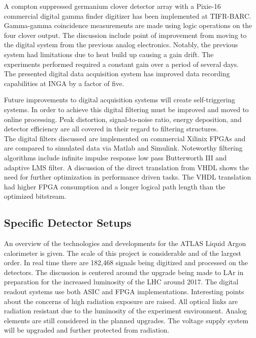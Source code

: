 \documentclass[12pt]{article}
\begin{document}
\begin{doublespacing}
{\large\textbf{\cite{Palit201290}}}

A compton suppressed germanium clover detector array with a Pixie-16 commercial digital gamma finder digitizer has been implemented at TIFR-BARC. Gamma-gamma coincidence measurements are made using logic operations on the four clover output. The discussion include point of improvement from moving to the digital system from the previous analog electronics. Notably, the previous system had limitations due to heat build up causing a gain drift. The experiments performed required a constant gain over a period of several days. The presented digital data acquisition system has improved data recording capabilities at INGA by a factor of five.
\\[20pt]


{\large\textbf{\cite{Alberto200999}}}

Future improvements to digital acquisition systems will create self-triggering systems. In order to achieve this digital filtering must be improved and moved to online processing. Peak distortion, signal-to-noise ratio, energy deposition, and detector efficiency are all covered in their regard to filtering structures.
\\
The digital filters discussed are implemented on commercial Xilinix FPGAs and are compared to simulated data via Matlab and Simulink. Noteworthy filtering algorithms include infinite impulse response low pass Butterworth III and adaptive LMS filter. A discussion of the direct translation from VHDL shows the need for further optimization in performance driven tasks. The VHDL translation had higher FPGA consumption and a longer logical path length than the optimized bitstream.
\\[20pt]


\subsection{Specific Detector Setups}

{\large\textbf{\cite{Chen2010261}}}

An overview of the technologies and developments for the ATLAS Liquid Argon calorimeter is given. The scale of this project is considerable and of the largest order. In real time there are 182,468 signals being digitized and processed on the detectors. The discussion is centered around the upgrade being made to LAr in preparation for the increased luminosity of the LHC around 2017. The digital readout systems use both ASIC and FPGA implementations.
Interesting points about the concerns of high radiation exposure are raised. All optical links are radiation resistant due to the luminosity of the experiment environment. Analog elements are still considered in the planned upgrades. The voltage supply system will be upgraded and further protected from radiation.
 \\[20pt]



\end{doublespacing}
\end{document}
